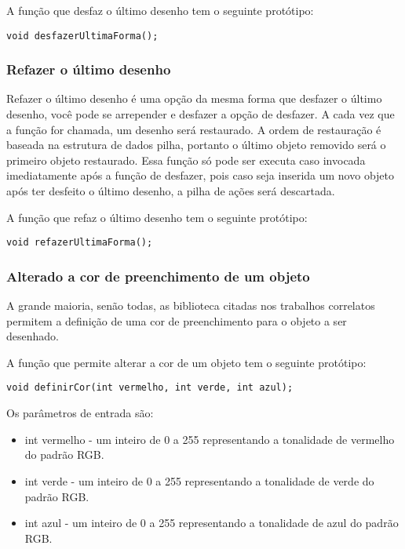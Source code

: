 \documentclass[12pt, %
openright,
oneside, %
a4paper,    %
brazil]{facom-ufu-abntex2}
\begin{document}
A função que desfaz o último desenho tem o seguinte protótipo:

\begin{verbatim}
void desfazerUltimaForma();
\end{verbatim}

\subsubsection{Refazer o último desenho}
Refazer o último desenho é uma opção da mesma forma que desfazer o último desenho, você pode se arrepender e desfazer a opção de desfazer. A cada vez que a função for chamada, um desenho será restaurado. A ordem de restauração é baseada na estrutura de dados pilha, portanto o último objeto removido será o primeiro objeto restaurado. Essa função só pode ser executa caso invocada imediatamente após a função de desfazer, pois caso seja inserida um novo objeto após ter desfeito o último desenho, a pilha de ações será descartada.

A função que refaz o último desenho tem o seguinte protótipo:

\begin{verbatim}
void refazerUltimaForma();
\end{verbatim}

\subsubsection{Alterado a cor de preenchimento de um objeto} \label{api_definirCor}
A grande maioria, senão todas, as biblioteca citadas nos trabalhos correlatos permitem a definição de uma cor de preenchimento para o objeto a ser desenhado.

A função que permite alterar a cor de um objeto tem o seguinte protótipo:

\begin{verbatim}
void definirCor(int vermelho, int verde, int azul);
\end{verbatim}

Os parâmetros de entrada são:

\begin{itemize}
    \item int vermelho - um inteiro de 0 a 255 representando a tonalidade de vermelho do padrão RGB.
    \item int verde - um inteiro de 0 a 255 representando a tonalidade de verde do padrão RGB.
    \item int azul - um inteiro de 0 a 255 representando a tonalidade de azul do padrão RGB.
\end{itemize}
\end{document}
